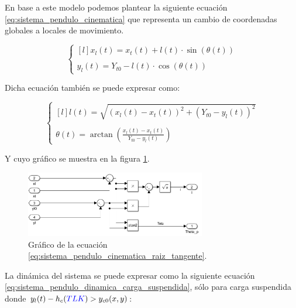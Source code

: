 \documentclass[11pt]{article}
\begin{document}
\newpage

En base a este modelo podemos plantear la siguiente ecuación \ref{eq:sistema_pendulo_cinematica} que representa un cambio de coordenadas globales a locales de movimiento.

\begin{equation}
	\label{eq:sistema_pendulo_cinematica}
	\left\{
		\begin{matrix*}[l]
		x_{l}(t)=x_{t}(t) + l(t)\cdot \sin(\theta(t))
		\\
		\\ 
		y_{l}(t)=Y_{t0} - l(t)\cdot \cos(\theta(t))
		\end{matrix*}
	\right.
\end{equation}

Dicha ecuación también se puede expresar como:

\begin{equation}
	\label{eq:sistema_pendulo_cinematica_raiz_tangente}
	\left\{
		\begin{matrix*}[l]
		l(t)=\sqrt{\left ( x_{l}(t)-x_{t}(t) \right )^{2}+\left ( Y_{t0}-y_{l}(t) \right )^{2}}
		\\
		\\ 
		\theta(t)=\arctan \left ( \frac{x_{l}(t)-x_{t}(t)}{Y_{t0}-y_{l}(t)} \right )
		\end{matrix*}
	\right.
\end{equation}

Y cuyo gráfico se muestra en la figura \ref{fig:sistema_pendulo_cinematica_raiz_tangente}.

\begin{figure}[h!]
	\centering
	\includegraphics[width=0.7\textwidth]{images/imagen_8_sistema_pendulo_cinematica_raiz_tangente.png}
	\caption{Gráfico de la ecuación \ref{eq:sistema_pendulo_cinematica_raiz_tangente}.}
	\label{fig:sistema_pendulo_cinematica_raiz_tangente}
\end{figure}

\newpage

La dinámica del sistema se puede expresar como la siguiente ecuación \ref{eq:sistema_pendulo_dinamica_carga_suspendida}, sólo para carga suspendida donde $y_{l}(t)-h_{c}({\color{blue}TLK})>y_{c0}(x,y)$:
\end{document}
